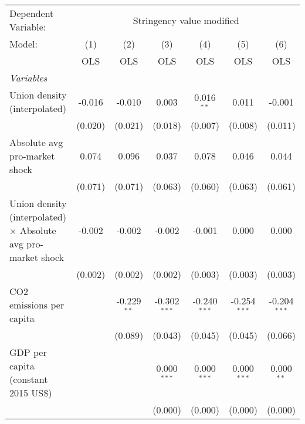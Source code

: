 
\begingroup
\centering
\begin{tabular}{lcccccc}
   \toprule
   Dependent Variable: & \multicolumn{6}{c}{Stringency value modified}\\
   Model:                                                               & (1)     & (2)           & (3)            & (4)            & (5)            & (6)\\  
                                                                        &  OLS    & OLS           & OLS            & OLS            & OLS            & OLS\\  
   \midrule
   \emph{Variables}\\
   Union density (interpolated)                                         & -0.016  & -0.010        & 0.003          & 0.016$^{**}$   & 0.011          & -0.001\\   
                                                                        & (0.020) & (0.021)       & (0.018)        & (0.007)        & (0.008)        & (0.011)\\   
   Absolute avg pro-market shock                                        & 0.074   & 0.096         & 0.037          & 0.078          & 0.046          & 0.044\\   
                                                                        & (0.071) & (0.071)       & (0.063)        & (0.060)        & (0.063)        & (0.061)\\   
   Union density (interpolated) $\times$ Absolute avg pro-market shock  & -0.002  & -0.002        & -0.002         & -0.001         & 0.000          & 0.000\\   
                                                                        & (0.002) & (0.002)       & (0.002)        & (0.003)        & (0.003)        & (0.003)\\   
   CO2 emissions per capita                                             &         & -0.229$^{**}$ & -0.302$^{***}$ & -0.240$^{***}$ & -0.254$^{***}$ & -0.204$^{***}$\\   
                                                                        &         & (0.089)       & (0.043)        & (0.045)        & (0.045)        & (0.066)\\   
   GDP per capita (constant 2015 US\$)                                  &         &               & 0.000$^{***}$  & 0.000$^{***}$  & 0.000$^{***}$  & 0.000$^{**}$\\   
                                                                        &         &               & (0.000)        & (0.000)        & (0.000)        & (0.000)\\   

\end{tabular}
